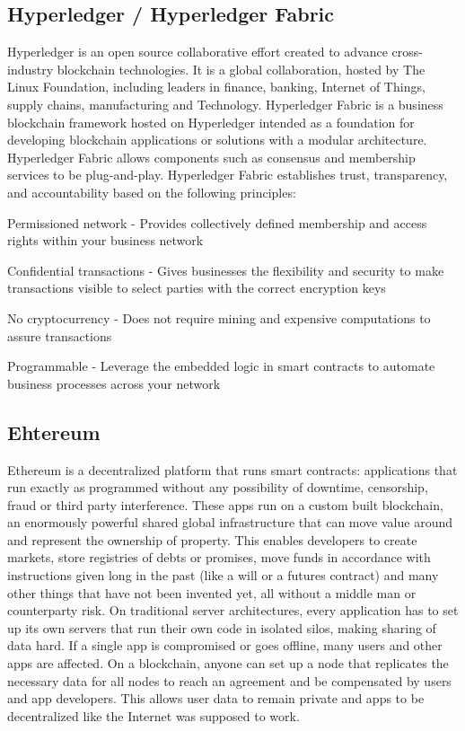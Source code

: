 \subsection*{Hyperledger / Hyperledger Fabric}
Hyperledger is an open source collaborative effort created to advance cross-industry blockchain technologies. It is a global collaboration, hosted by The Linux Foundation, including leaders in finance, banking, Internet of Things, supply chains, manufacturing and Technology.
Hyperledger Fabric is a business blockchain framework hosted on Hyperledger intended as a foundation for developing blockchain applications or solutions with a modular architecture. Hyperledger Fabric allows components such as consensus and membership services to be plug-and-play.
Hyperledger Fabric establishes trust, transparency, and accountability based on the following principles:
\begin{list}{}{}
\item Permissioned network - Provides collectively defined membership and access rights within your business network
\item Confidential transactions - Gives businesses the flexibility and security to make transactions visible to select parties with the correct encryption keys
\item No cryptocurrency - Does not require mining and expensive computations to assure transactions
\item Programmable - Leverage the embedded logic in smart contracts to automate business processes across your network
\end{list}

\subsection*{Ehtereum}
Ethereum is a  decentralized platform that runs smart contracts: applications that run exactly as programmed without any possibility of downtime, censorship, fraud or third party interference.
These apps run on a custom built  blockchain, an enormously powerful shared global infrastructure that can move value around and represent the ownership of property. This enables developers to create markets, store registries of debts or promises, move funds in accordance with instructions given long in the past (like a will or a futures contract) and many other things that have not been invented yet, all without a middle man or counterparty risk.
On traditional server architectures, every application has to set up its own servers that run their own code in isolated silos, making sharing of data hard. If a single app is compromised or goes offline, many users and other apps are affected.
On a blockchain, anyone can set up a node that replicates the necessary data for all nodes to reach an agreement and be compensated by users and app developers. This allows user data to remain private and apps to be decentralized like the Internet was supposed to work.
